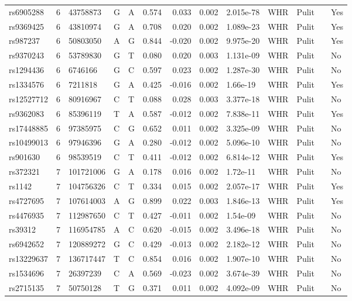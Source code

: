 \documentclass[11pt,twoside]{bristolthesis}
\begin{document}
\begin{longtable}[t]{lrlllrrrlllll}
rs6905288 & 6 & 43758873 & G & A & 0.574 & 0.033 & 0.002 & 2.015e-78 & WHR & Pulit &  & Yes\\
rs9369425 & 6 & 43810974 & G & A & 0.708 & 0.020 & 0.002 & 1.089e-23 & WHR & Pulit &  & Yes\\
rs987237 & 6 & 50803050 & A & G & 0.844 & -0.020 & 0.002 & 9.975e-20 & WHR & Pulit &  & Yes\\
\addlinespace
rs9370243 & 6 & 53789830 & G & T & 0.080 & 0.020 & 0.003 & 1.131e-09 & WHR & Pulit &  & No\\
rs1294436 & 6 & 6746166 & G & C & 0.597 & 0.023 & 0.002 & 1.287e-30 & WHR & Pulit &  & No\\
rs1334576 & 6 & 7211818 & G & A & 0.425 & -0.016 & 0.002 & 1.66e-19 & WHR & Pulit &  & Yes\\
rs12527712 & 6 & 80916967 & C & T & 0.088 & 0.028 & 0.003 & 3.377e-18 & WHR & Pulit &  & No\\
rs9362083 & 6 & 85396119 & T & A & 0.587 & -0.012 & 0.002 & 7.838e-11 & WHR & Pulit &  & Yes\\
\addlinespace
rs17448885 & 6 & 97385975 & C & G & 0.652 & 0.011 & 0.002 & 3.325e-09 & WHR & Pulit &  & No\\
rs10499013 & 6 & 97946396 & G & A & 0.280 & -0.012 & 0.002 & 5.096e-10 & WHR & Pulit &  & No\\
rs901630 & 6 & 98539519 & C & T & 0.411 & -0.012 & 0.002 & 6.814e-12 & WHR & Pulit &  & Yes\\
rs372321 & 7 & 101721006 & G & A & 0.178 & 0.016 & 0.002 & 1.72e-11 & WHR & Pulit &  & No\\
rs1142 & 7 & 104756326 & C & T & 0.334 & 0.015 & 0.002 & 2.057e-17 & WHR & Pulit &  & Yes\\
\addlinespace
rs4727695 & 7 & 107614003 & A & G & 0.899 & 0.022 & 0.003 & 1.846e-13 & WHR & Pulit &  & Yes\\
rs4476935 & 7 & 112987650 & C & T & 0.427 & -0.011 & 0.002 & 1.54e-09 & WHR & Pulit &  & No\\
rs39312 & 7 & 116954785 & A & C & 0.620 & -0.015 & 0.002 & 3.496e-18 & WHR & Pulit &  & No\\
rs6942652 & 7 & 120889272 & G & C & 0.429 & -0.013 & 0.002 & 2.182e-12 & WHR & Pulit &  & No\\
rs13229637 & 7 & 136717447 & T & C & 0.854 & 0.016 & 0.002 & 1.907e-10 & WHR & Pulit &  & No\\
\addlinespace
rs1534696 & 7 & 26397239 & C & A & 0.569 & -0.023 & 0.002 & 3.674e-39 & WHR & Pulit &  & No\\
rs2715135 & 7 & 50750128 & T & G & 0.371 & 0.011 & 0.002 & 4.092e-09 & WHR & Pulit &  & No\\

\end{longtable}
\end{document}
